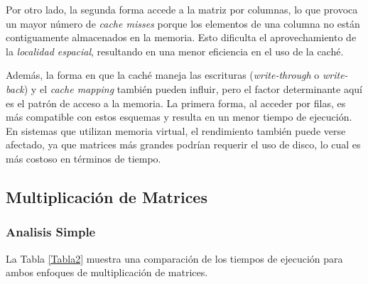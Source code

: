 \documentclass[conference]{IEEEtran}
\begin{document}
Por otro lado, la segunda forma accede a la matriz por columnas, lo que provoca un mayor
número de \textit{cache misses} porque los elementos de una columna no están contiguamente
almacenados en la memoria. Esto dificulta el aprovechamiento de la \textit{localidad espacial},
resultando en una menor eficiencia en el uso de la caché.

Además, la forma en que la caché maneja las escrituras (\textit{write-through} o \textit{write-back}) y
el \textit{cache mapping} también pueden influir, pero el factor determinante aquí es el patrón de acceso
a la memoria. La primera forma, al acceder por filas, es más compatible con estos esquemas y resulta en un
menor tiempo de ejecución. En sistemas que utilizan memoria virtual, el rendimiento también puede verse
afectado, ya que matrices más grandes podrían requerir el uso de disco, lo cual es más costoso en términos
de tiempo.

\subsection{\textbf{Multiplicación de Matrices}}
\subsubsection{\textbf{Analisis Simple}}
La Tabla \ref{Tabla2} muestra una comparación de los tiempos de ejecución para ambos enfoques de multiplicación de matrices.
\end{document}
